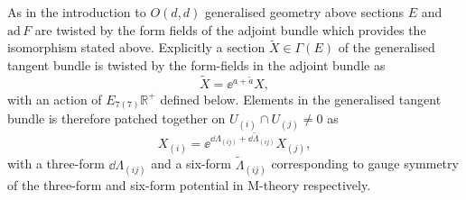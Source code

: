 As in the introduction to $O(d,d)$ generalised geometry above sections $E$ and $\text{ad}\,F$ are twisted by the form fields of the adjoint bundle which provides the isomorphism stated above. Explicitly a section $\tilde{X}\in \Gamma(E)$ of the generalised tangent bundle is twisted by the form-fields in the adjoint bundle as
\begin{equation}
    \tilde{X} = \ee^{a+\tilde{a}}X,
\end{equation}
with an action of $E_{7(7)}\mathbb{R}^+$ defined below. Elements in the generalised tangent bundle is therefore patched together on $U_{(i)}\cap U_{(j)}\neq 0$ as 
\begin{equation}
    X_{(i)} = \ee^{\dd\Lambda_{(ij)}+\dd\tilde{\Lambda}_{(ij)}}X_{(j)},
\end{equation}
with a three-form $\dd \Lambda_{(ij)}$  and a six-form $\tilde{\Lambda}_{(ij)}$ corresponding to gauge symmetry of the three-form and six-form potential in M-theory respectively. 


